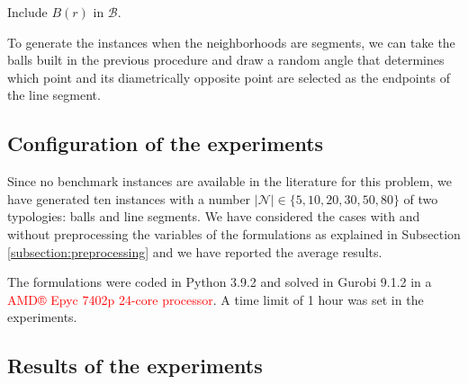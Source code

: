 \documentclass[a4paper]{elsarticle}
\begin{document}
{\begin{algorithm}[H]
{{		Include $B(r)$ in $\mathcal B$.
		
		
	}
}
\end{algorithm}

To generate the instances when the neighborhoods are segments, we can take the balls built in the previous procedure and draw a random angle that determines which point and its diametrically opposite point are selected as the endpoints of the line segment.


\subsection{Configuration of the experiments}
Since no benchmark instances are available in the literature for this problem, we have generated ten instances with a number $|\mathcal N|\in\{5, 10, 20, 30, 50, 80\}$ of two typologies: balls and line segments. We have considered the cases with and without preprocessing the variables of the formulations as explained in Subsection \ref{subsection:preprocessing} and we have reported the average results. 

The formulations were coded in Python 3.9.2 and solved in Gurobi 9.1.2 \cite{GurobiOptimization2021} in a \textcolor{red}{AMD® Epyc 7402p 24-core processor}. A time limit of 1 hour was set in the experiments.

}
\subsection{Results of the experiments}


\end{document}
